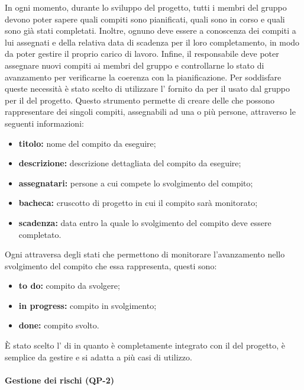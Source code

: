 			In ogni momento, durante lo sviluppo del progetto, tutti i membri del gruppo devono poter sapere quali compiti sono pianificati, quali sono in corso e quali sono già stati completati. Inoltre, ognuno deve essere a conoscenza dei compiti a lui assegnati e della relativa data di scadenza per il loro completamento, in modo da poter gestire il proprio carico di lavoro. Infine, il responsabile deve poter assegnare nuovi compiti ai membri del gruppo e controllarne lo stato di avanzamento per verificarne la coerenza con la pianificazione.
			\newline
			Per soddisfare queste necessità è stato scelto di utilizzare l' fornito da  per il  usato dal gruppo per il  del progetto.
			\newline
			Questo strumento permette di creare delle  che possono rappresentare dei singoli compiti, assegnabili ad una o più persone, attraverso le seguenti informazioni:
			\begin{itemize}
				\item \textbf{titolo:} nome del compito da eseguire;
				\item \textbf{descrizione:} descrizione dettagliata del compito da eseguire;
				\item \textbf{assegnatari:} persone a cui compete lo svolgimento del compito;
				\item \textbf{bacheca:} cruscotto di progetto in cui il compito sarà monitorato;
				\item \textbf{scadenza:} data entro la quale lo svolgimento del compito deve essere completato.
			\end{itemize}
			Ogni  attraversa degli stati che permettono di monitorare l'avanzamento nello svolgimento del compito che essa rappresenta, questi sono:
			\begin{itemize}
				\item \textbf{to do:} compito da svolgere;
				\item \textbf{in progress:} compito in svolgimento;
				\item \textbf{done:} compito svolto.
			\end{itemize}
			È stato scelto l' di  in quanto è completamente integrato con il  del progetto, è semplice da gestire e si adatta a più casi di utilizzo.

		\paragraph{Gestione dei rischi (QP-2)}

